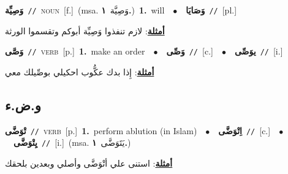 \documentclass[10pt,a4paper,twoside]{article} %
\begin{document}
\begin{multicols}{2}
{\setlength\topsep{0pt}\textbf{\foreignlanguage{arabic}{وَصِيِّة}}\ {\color{gray}\texttt{//}\color{black}}\ \textsc{noun}\ [f.]\ \color{gray}(msa. \foreignlanguage{arabic}{وَصِيَّة}~\foreignlanguage{arabic}{\textbf{١.}})\color{black}\ \textbf{1.}~will\ \ $\bullet$\ \ \setlength\topsep{0pt}\textbf{\foreignlanguage{arabic}{وَصَايَا}}\ {\color{gray}\texttt{//}\color{black}}\ [pl.]\  \begin{flushright}\color{gray}\foreignlanguage{arabic}{\textbf{\underline{\foreignlanguage{arabic}{أمثلة}}}: لازم تنفذوا وَصِيِّة أبوكم وتقسموا الورثة}\end{flushright}\color{black}} \vspace{2mm}

{\setlength\topsep{0pt}\textbf{\foreignlanguage{arabic}{وَصَّى}}\ {\color{gray}\texttt{//}\color{black}}\ \textsc{verb}\ [p.]\ \textbf{1.}~make an order\ \ $\bullet$\ \ \setlength\topsep{0pt}\textbf{\foreignlanguage{arabic}{وَصِّى}}\ {\color{gray}\texttt{//}\color{black}}\ [c.]\ \ $\bullet$\ \ \setlength\topsep{0pt}\textbf{\foreignlanguage{arabic}{يوَصِّى}}\ {\color{gray}\texttt{//}\color{black}}\ [i.]\  \begin{flushright}\color{gray}\foreignlanguage{arabic}{\textbf{\underline{\foreignlanguage{arabic}{أمثلة}}}: إِذا بدك عكُّوب احكيلي بوصِّيلك معي}\end{flushright}\color{black}} \vspace{2mm}

\vspace{-3mm}
\subsection*{\color{blue}\foreignlanguage{arabic}{و.ض.ء}\color{blue}{}} 

{\setlength\topsep{0pt}\textbf{\foreignlanguage{arabic}{تْوَضَّى}}\ {\color{gray}\texttt{//}\color{black}}\ \textsc{verb}\ [p.]\ \textbf{1.}~perform ablution (in Islam)\ \ $\bullet$\ \ \setlength\topsep{0pt}\textbf{\foreignlanguage{arabic}{اِتْوَضَّى}}\ {\color{gray}\texttt{//}\color{black}}\ [c.]\ \ $\bullet$\ \ \setlength\topsep{0pt}\textbf{\foreignlanguage{arabic}{يِتْوَضَّى}}\ {\color{gray}\texttt{//}\color{black}}\ [i.]\ \color{gray}(msa. \foreignlanguage{arabic}{يَتَوَضَّى}~\foreignlanguage{arabic}{\textbf{١.}})\color{black}\  \begin{flushright}\color{gray}\foreignlanguage{arabic}{\textbf{\underline{\foreignlanguage{arabic}{أمثلة}}}: استنى علي أتْوَضَّى وأصلي وبعدين بلحقك}\end{flushright}\color{black}} \vspace{2mm}


\end{multicols}
\end{document}
